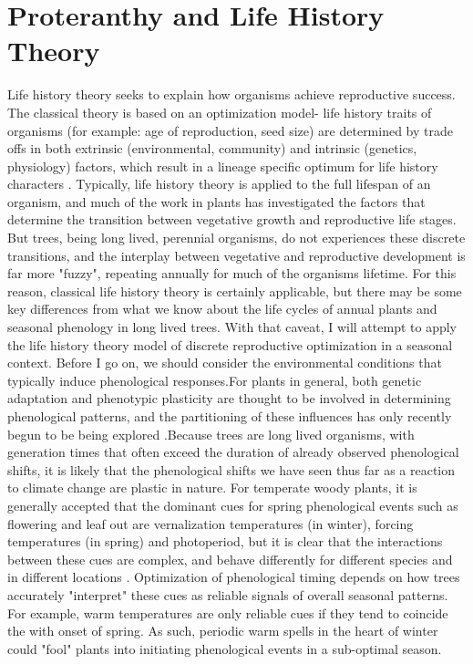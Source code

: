 \documentclass{article}\usepackage[]{graphicx}\usepackage[]{color}
\begin{document}
\section{Proteranthy and Life History Theory}
\par Life history theory seeks to explain how organisms achieve reproductive success. The classical theory is based on an optimization model- life history traits of organisms (for example: age of reproduction, seed size) are determined by trade offs in both extrinsic (environmental, community) and intrinsic (genetics, physiology) factors, which result in a lineage specific optimum for life history characters \citep{Stearns2000}.  Typically, life history theory is applied to the full lifespan of an organism, and much of the work in plants has investigated the factors that determine the transition between vegetative growth and reproductive life stages\citep{Glover2014}. But trees, being long lived, perennial organisms, do not experiences these discrete transitions, and the interplay between vegetative and reproductive development is far more "fuzzy", repeating annually for much of the organisms lifetime. For this reason, classical life history theory is certainly applicable, but there may be some key differences from what we know about the life cycles of annual plants and seasonal phenology in long lived trees. With that caveat, I will attempt to apply the life history theory model of discrete reproductive optimization in a seasonal context.
Before I go on, we should consider the environmental conditions that typically induce phenological responses.For plants in general, both genetic adaptation and phenotypic plasticity are thought to be involved in determining phenological patterns, and the partitioning of these influences has only recently begun to be being explored \citep{Anderson2012}.Because trees are long lived organisms, with generation times that often exceed the duration of already observed phenological shifts, it is likely that the phenological shifts we have seen thus far as a reaction to climate change are plastic in nature. For temperate woody plants, it is generally accepted that the dominant cues for spring phenological events such as flowering and leaf out are vernalization temperatures (in winter), forcing temperatures (in spring) and photoperiod, but it is clear that the interactions between these cues are complex, and behave differently for different species and in different locations \citep{Forrest2010}. Optimization of phenological timing depends on how trees accurately "interpret" these cues as reliable signals of overall seasonal patterns. For example, warm temperatures are only reliable cues if they tend to coincide the with onset of spring. As such, periodic warm spells in the heart of winter could "fool" plants into initiating phenological events in a sub-optimal season. 
\end{document}

